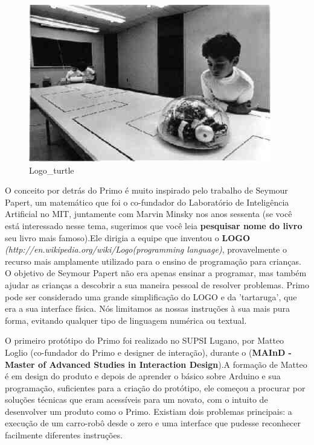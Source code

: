\documentclass[paper=a4, fontsize=11pt]{scrartcl} %
\numberwithin{equation}{section} %
\numberwithin{figure}{section} %
\numberwithin{table}{section} %
\begin{document}
\begin{figure}[h] %
\centering
\includegraphics[scale=0.35]{./imagens/logo-turtle.jpg}
\caption[logo_t ]{Logo\_turtle}
\end{figure}

O conceito por detrás do Primo é muito inspirado pelo trabalho de Seymour Papert, um matemático que foi o co-fundador do Laboratório de Inteligência Artificial no MIT, juntamente com Marvin Minsky nos anos sessenta (se você está interessado nesse tema, sugerimos que você leia \textbf{pesquisar nome do livro} seu livro mais famoso).Ele dirigia a equipe que inventou o \textbf{LOGO} \textit{(http://en.wikipedia.org/wiki/Logo(programming language)}, provavelmente o recurso mais amplamente utilizado para o ensino de programação para crianças. O objetivo de Seymour Papert não era apenas ensinar a programar, mas também ajudar as crianças a descobrir a sua maneira pessoal de resolver problemas. Primo pode ser considerado uma grande simplificação do LOGO e da 'tartaruga', que era a sua interface física. Nós limitamos as nossas instruções à sua mais pura forma, evitando qualquer tipo de linguagem numérica ou textual.

O primeiro protótipo do Primo foi realizado no SUPSI Lugano, por Matteo Loglio (co-fundador do Primo e designer de interação), durante o (\textbf{MAInD - Master of Advanced Studies in Interaction Design}).A formação de Matteo é em design do produto e depois de aprender o básico sobre Arduino e sua programação, suficientes para a criação do protótipo, ele começou a procurar por soluções técnicas que eram acessíveis para um novato, com o intuito de desenvolver um produto como o Primo. Existiam dois problemas principais: a execução de um carro-robô desde o zero e uma interface que pudesse reconhecer facilmente diferentes instruções.
\end{document}
